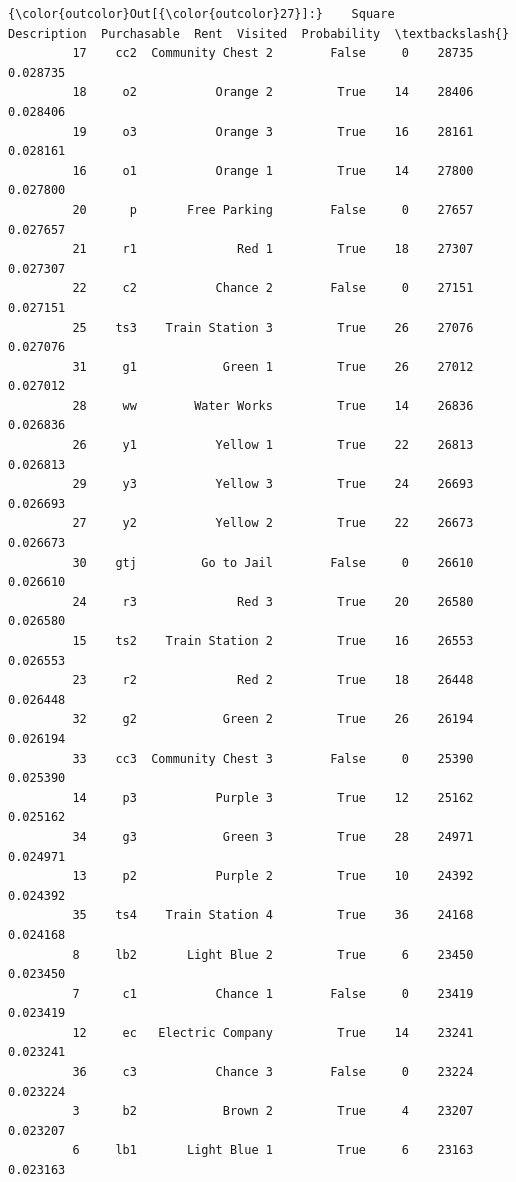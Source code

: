 \documentclass[11pt]{article}
\begin{document}
\begin{Verbatim}[commandchars=\\\{\}]
{\color{outcolor}Out[{\color{outcolor}27}]:}    Square        Description  Purchasable  Rent  Visited  Probability  \textbackslash{}
         17    cc2  Community Chest 2        False     0    28735     0.028735   
         18     o2           Orange 2         True    14    28406     0.028406   
         19     o3           Orange 3         True    16    28161     0.028161   
         16     o1           Orange 1         True    14    27800     0.027800   
         20      p       Free Parking        False     0    27657     0.027657   
         21     r1              Red 1         True    18    27307     0.027307   
         22     c2           Chance 2        False     0    27151     0.027151   
         25    ts3    Train Station 3         True    26    27076     0.027076   
         31     g1            Green 1         True    26    27012     0.027012   
         28     ww        Water Works         True    14    26836     0.026836   
         26     y1           Yellow 1         True    22    26813     0.026813   
         29     y3           Yellow 3         True    24    26693     0.026693   
         27     y2           Yellow 2         True    22    26673     0.026673   
         30    gtj         Go to Jail        False     0    26610     0.026610   
         24     r3              Red 3         True    20    26580     0.026580   
         15    ts2    Train Station 2         True    16    26553     0.026553   
         23     r2              Red 2         True    18    26448     0.026448   
         32     g2            Green 2         True    26    26194     0.026194   
         33    cc3  Community Chest 3        False     0    25390     0.025390   
         14     p3           Purple 3         True    12    25162     0.025162   
         34     g3            Green 3         True    28    24971     0.024971   
         13     p2           Purple 2         True    10    24392     0.024392   
         35    ts4    Train Station 4         True    36    24168     0.024168   
         8     lb2       Light Blue 2         True     6    23450     0.023450   
         7      c1           Chance 1        False     0    23419     0.023419   
         12     ec   Electric Company         True    14    23241     0.023241   
         36     c3           Chance 3        False     0    23224     0.023224   
         3      b2            Brown 2         True     4    23207     0.023207   
         6     lb1       Light Blue 1         True     6    23163     0.023163   

\end{Verbatim}
\end{document}
